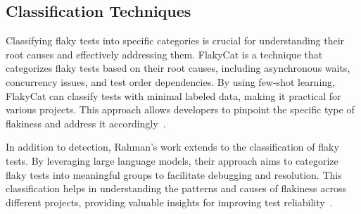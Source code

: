 \subsection{Classification Techniques}

Classifying flaky tests into specific categories is crucial for understanding their root causes and effectively addressing them. FlakyCat is a technique that categorizes flaky tests based on their root causes, including asynchronous waits, concurrency issues, and test order dependencies. By using few-shot learning, FlakyCat can classify tests with minimal labeled data, making it practical for various projects. This approach allows developers to pinpoint the specific type of flakiness and address it accordingly~\cite{Akli2023}.

In addition to detection, Rahman’s work extends to the classification of flaky tests. By leveraging large language models, their approach aims to categorize flaky tests into meaningful groups to facilitate debugging and resolution. This classification helps in understanding the patterns and causes of flakiness across different projects, providing valuable insights for improving test reliability~\cite{rahman2024}.